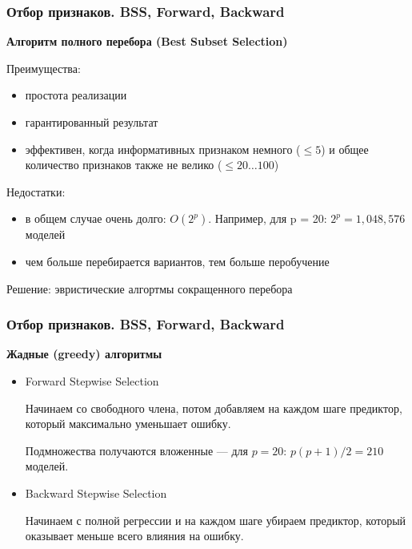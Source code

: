\documentclass[ucs, notheorems, handout]{beamer}
\begin{document}
\begin{frame}
	\frametitle{Отбор признаков. BSS, Forward, Backward}
	
	\textbf{Алгоритм полного перебора (Best Subset Selection)}
		
		
		Преимущества:
		\begin{itemize}
		\item[\checkmark]простота реализации
		\item[\checkmark]гарантированный результат
		\item[\checkmark] эффективен, когда информативных признаком немного ($\le 5$) и общее количество признаков также не велико ($\le 20 \dots 100$)
	\end{itemize}

		Недостатки:
		\begin{itemize}
		\item[\ding{55}]в общем случае очень долго: $O(2^p)$. Например, для p = 20: $2^p = 1,048,576$ моделей
		\item[\ding{55}]чем больше перебирается вариантов, тем больше перобучение
		
\end{itemize}
		Решение: эвристические алгортмы сокращенного перебора
		
\end{frame}
\begin{frame}
	\frametitle{Отбор признаков. BSS, Forward, Backward}
	
	\textbf{Жадные (greedy) алгоритмы}
	
	
	\begin{itemize}
		\item Forward Stepwise Selection 
		
		
		Начинаем со свободного члена, потом добавляем на каждом шаге предиктор, который
		максимально уменьшает ошибку. 
		
		Подмножества получаются вложенные ---  для $p = 20$: $p (p + 1) / 2 = 210$ моделей.
		
		\item Backward Stepwise Selection
		
		Начинаем с полной регрессии и на каждом шаге убираем предиктор, который оказывает меньше всего влияния на ошибку.
	\end{itemize}

\end{frame}
\end{document}
